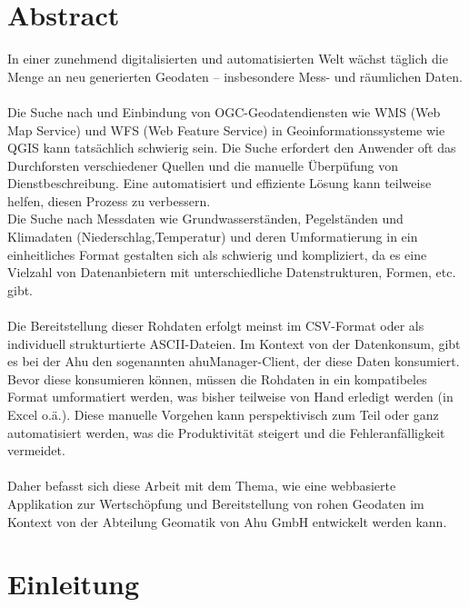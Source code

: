 \documentclass[a4paper,12pt]{scrreprt}
\begin{document}
\cleardoublepage
\chapter*{Abstract}
\thispagestyle{plain}
In einer zunehmend digitalisierten und automatisierten Welt wächst täglich die Menge an neu generierten Geodaten – insbesondere Mess- und räumlichen Daten.\\ \\
Die Suche nach und Einbindung von OGC-Geodatendiensten wie WMS (Web Map Service) und WFS (Web Feature Service) in Geoinformationssysteme wie QGIS kann tatsächlich schwierig sein. Die Suche erfordert den Anwender oft das Durchforsten verschiedener Quellen und die manuelle Überpüfung von Dienstbeschreibung. Eine automatisiert und effiziente Lösung kann teilweise helfen, diesen Prozess zu verbessern. \\ 
Die Suche nach Messdaten wie Grundwasserständen, Pegelständen und Klimadaten (Niederschlag,Temperatur) und deren Umformatierung in ein einheitliches Format gestalten sich als schwierig und kompliziert, da es eine Vielzahl von Datenanbietern mit unterschiedliche Datenstrukturen, Formen, etc. gibt.\\ \\
Die Bereitstellung dieser Rohdaten erfolgt meinst im CSV-Format oder als individuell strukturtierte ASCII-Dateien. Im Kontext von der Datenkonsum, gibt es bei der Ahu den sogenannten ahuManager-Client, der diese Daten konsumiert. Bevor diese konsumieren können, müssen die Rohdaten in ein kompatibeles Format umformatiert werden, was bisher teilweise von Hand erledigt werden (in Excel o.ä.). Diese manuelle Vorgehen kann perspektivisch zum Teil oder ganz automatisiert werden, was die Produktivität steigert und die Fehleranfälligkeit vermeidet. \\ \\
Daher befasst sich diese Arbeit  mit dem Thema, wie eine webbasierte Applikation zur Wertschöpfung und Bereitstellung von rohen Geodaten im Kontext von der Abteilung Geomatik von Ahu GmbH entwickelt werden kann.

\clearpage
\chapter{Einleitung}
\end{document}
